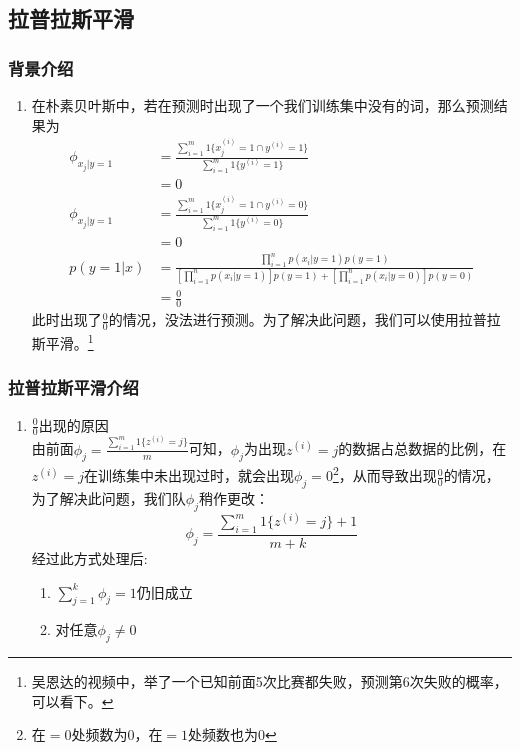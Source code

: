 \subsection{拉普拉斯平滑}
\subsubsection{背景介绍}
\begin{enumerate}
	\item 在朴素贝叶斯中，若在预测时出现了一个我们训练集中没有的词，那么预测结果为
	\begin{align}
		\phi_{{x_j}|y=1} &= \frac{\sum_{i=1}^{m}1\{x_j^{(i)}=1 \cap y^{(i)}=1\}}{\sum_{i=1}^{m}1\{y^{(i)}=1\}} \\
		&= 0 \\
		\phi_{{x_j}|y=1} &= \frac{\sum_{i=1}^{m}1\{x_j^{(i)}=1 \cap y^{(i)}=0\}}{\sum_{i=1}^{m}1\{y^{(i)}=0\}} \\
		&= 0 \\
		p(y=1|x) &= \frac{\prod_{i=1}^{n}p(x_i|y=1)p(y=1)}{\left[\prod_{i=1}^{n}p(x_i|y=1)\right]p(y=1)+\left[\prod_{i=1}^{n}p(x_i|y=0)\right]p(y=0)} \\
		&= \frac{0}{0}
	\end{align}
	此时出现了$\frac{0}{0}$的情况，没法进行预测。为了解决此问题，我们可以使用拉普拉斯平滑。\footnote{吴恩达的视频中，举了一个已知前面5次比赛都失败，预测第6次失败的概率，可以看下。}
\end{enumerate}

\subsubsection{拉普拉斯平滑介绍}
\begin{enumerate}
	\item $\frac{0}{0}$出现的原因 \\
	由前面$\phi_j = \frac{\sum_{i=1}^{m}1\{z^{(i)}=j\}}{m}$可知，$\phi_j$为出现$z^{(i)}=j$的数据占总数据的比例，在$z^{(i)}=j$在训练集中未出现过时，就会出现$\phi_j=0$\footnote{在$=0$处频数为0，在$=1$处频数也为0}，从而导致出现$\frac{0}{0}$的情况，为了解决此问题，我们队$\phi_j$稍作更改：
	\begin{equation}
		\phi_j = \frac{\sum_{i=1}^{m}1\{z^{(i)}=j\}+1}{m+k}
	\end{equation}
	经过此方式处理后:
	\begin{enumerate}
		\item $\sum_{j=1}^{k}\phi_j = 1$仍旧成立
		\item 对任意$\phi_j \neq 0$
	\end{enumerate}
\end{enumerate}













